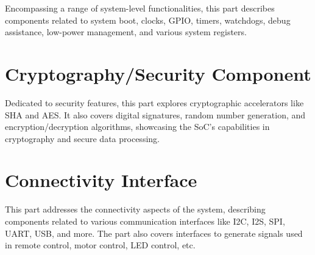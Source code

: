 \documentclass[openany, 10pt]{book}
\begin{document}
Encompassing a range of system-level functionalities, this part describes components related to system boot, clocks, GPIO, timers, watchdogs, debug assistance, low-power management, and various system registers.


\part{Cryptography/Security Component}

Dedicated to security features, this part explores cryptographic accelerators like SHA and AES. It also covers digital signatures, random number generation, and encryption/decryption algorithms, showcasing the SoC's capabilities in cryptography and secure data processing.




\part{Connectivity Interface}


This part addresses the connectivity aspects of the system, describing components related to various communication interfaces like I2C, I2S, SPI, UART, USB, and more. The part also covers interfaces to generate signals used in remote control, motor control, LED control, etc.

\end{document}
